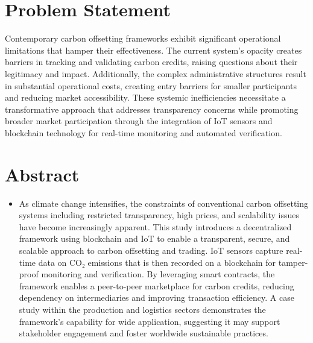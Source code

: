 \documentclass[oneside,a4paper,12pt]{book}
\begin{document}
\newpage
\section{Problem Statement}
\label{sec:problem}
Contemporary carbon offsetting frameworks exhibit significant operational limitations that hamper their effectiveness. The current system's opacity creates barriers in tracking and validating carbon credits, raising questions about their legitimacy and impact. Additionally, the complex administrative structures result in substantial operational costs, creating entry barriers for smaller participants and reducing market accessibility. These systemic inefficiencies necessitate a transformative approach that addresses transparency concerns while promoting broader market participation through the integration of IoT sensors and blockchain technology for real-time monitoring and automated verification.

\section{Abstract}
\begin{itemize}
	\item As climate change intensifies, the constraints of conventional carbon offsetting systems including restricted transparency, high prices, and scalability issues have become increasingly apparent. This study introduces a decentralized framework using blockchain and IoT to enable a transparent, secure, and scalable approach to carbon offsetting and trading. IoT sensors capture real-time data on CO₂ emissions that is then recorded on a blockchain for tamper-proof monitoring and verification. By leveraging smart contracts, the framework enables a peer-to-peer marketplace for carbon credits, reducing dependency on intermediaries and improving transaction efficiency. A case study within the production and logistics sectors demonstrates the framework's capability for wide application, suggesting it may support stakeholder engagement and foster worldwide sustainable practices.
\end{itemize}
\end{document}
